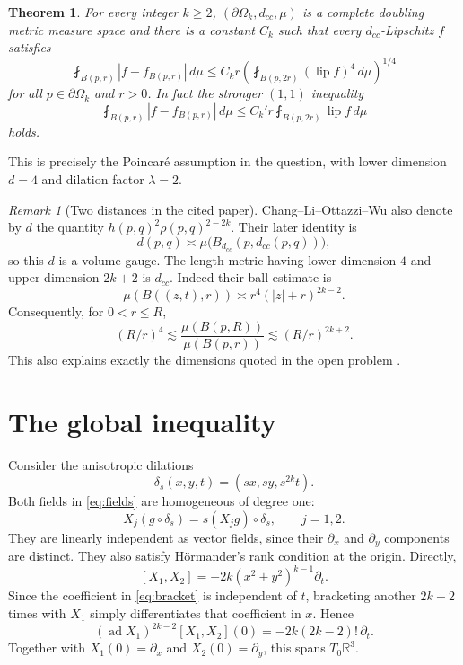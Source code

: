 \documentclass[11pt]{article}
\newtheorem{theorem}{Theorem}
\theoremstyle{remark}
\newtheorem{remark}{Remark}
\newcommand{\R}{\mathbb{R}}
\newcommand{\Om}{\partial\Omega_k}
\newcommand{\dcc}{d_{cc}}
\newcommand{\fintB}{\mathop{\fint}}
\newcommand{\lipf}{\operatorname{lip}f}
\newcommand{\ad}{\operatorname{ad}}
\begin{document}
\begin{theorem}\label{thm:main}
For every integer $k\ge2$, $(\Om,\dcc,\mu)$ is a complete doubling metric
measure space and there is a constant $C_k$ such that every
$\dcc$-Lipschitz $f$ satisfies
\begin{equation}\label{eq:p4}
 \fintB_{B(p,r)}|f-f_{B(p,r)}|\,d\mu
 \le C_k r
 \left(\fintB_{B(p,2r)}(\lipf)^4\,d\mu\right)^{1/4}
\end{equation}
for all $p\in\Om$ and $r>0$.  In fact the stronger $(1,1)$ inequality
\begin{equation}\label{eq:p1}
 \fintB_{B(p,r)}|f-f_{B(p,r)}|\,d\mu
 \le C_k' r\fintB_{B(p,2r)}\lipf\,d\mu
\end{equation}
holds.
\end{theorem}

This is precisely the Poincar\'e assumption in the question, with lower
dimension $d=4$ and dilation factor $\lambda=2$.

\begin{remark}[Two distances in the cited paper]\label{rem:metric}
Chang--Li--Ottazzi--Wu also denote by $d$ the quantity
$h(p,q)^2\rho(p,q)^{2-2k}$.  Their later identity is
\[
 d(p,q)\asymp \mu\bigl(B_{\dcc}(p,\dcc(p,q))\bigr),
\]
so this $d$ is a volume gauge.  The length metric having lower dimension
$4$ and upper dimension $2k+2$ is $\dcc$.  Indeed their ball estimate is
\begin{equation}\label{eq:volume}
 \mu(B((z,t),r))\asymp r^4(|z|+r)^{2k-2}.
\end{equation}
Consequently, for $0<r\le R$,
\[
 (R/r)^4\lesssim\frac{\mu(B(p,R))}{\mu(B(p,r))}
 \lesssim(R/r)^{2k+2}.
\]
This also explains exactly the dimensions quoted in the open problem
\cite{CLOW}.
\end{remark}

\section{\texorpdfstring{\hspace{0.2em}}{}The global inequality}

Consider the anisotropic dilations
\[
 \delta_s(x,y,t)=(sx,sy,s^{2k}t).
\]
Both fields in \eqref{eq:fields} are homogeneous of degree one:
\begin{equation}\label{eq:hom}
 X_j(g\circ\delta_s)=s(X_jg)\circ\delta_s,
 \qquad j=1,2.
\end{equation}
They are linearly independent as vector fields, since their $\partial_x$ and
$\partial_y$ components are distinct.  They also satisfy H\"ormander's rank
condition at the origin.  Directly,
\begin{equation}\label{eq:bracket}
 [X_1,X_2]=-2k(x^2+y^2)^{k-1}\partial_t.
\end{equation}
Since the coefficient in \eqref{eq:bracket} is independent of $t$,
bracketing another $2k-2$ times with $X_1$ simply differentiates that
coefficient in $x$.  Hence
\begin{equation}\label{eq:terminal}
 (\ad X_1)^{2k-2}[X_1,X_2](0)
 =-2k(2k-2)!\,\partial_t.
\end{equation}
Together with $X_1(0)=\partial_x$ and $X_2(0)=\partial_y$, this spans
$T_0\R^3$.
\end{document}
